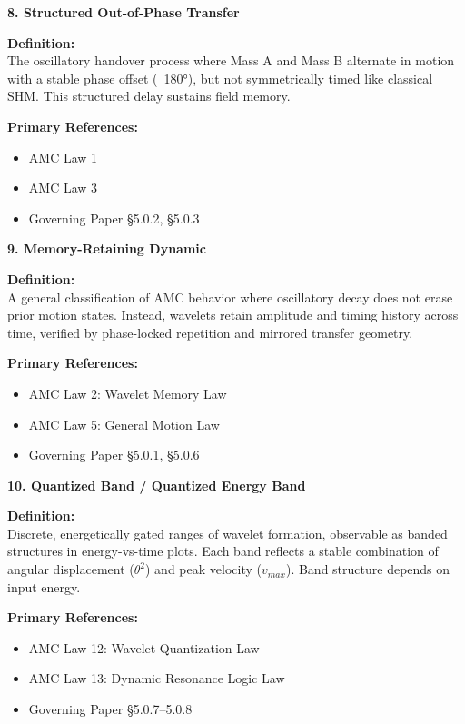 \documentclass[10pt,aps,pre,onecolumn,superscriptaddress,notitlepage]{revtex4-2}
\begin{document}
\vspace{1em}

\noindent\textbf{8. Structured Out-of-Phase Transfer}

\textbf{Definition:} \\
The oscillatory handover process where Mass A and Mass B alternate in motion with a stable phase offset (~180°), but not symmetrically timed like classical SHM. This structured delay sustains field memory.

\textbf{Primary References:}
\begin{itemize}[leftmargin=1.5em]
  \item AMC Law 1
  \item AMC Law 3
  \item Governing Paper §5.0.2, §5.0.3
\end{itemize}

\vspace{1em}

\noindent\textbf{9. Memory-Retaining Dynamic}

\textbf{Definition:} \\
A general classification of AMC behavior where oscillatory decay does not erase prior motion states. Instead, wavelets retain amplitude and timing history across time, verified by phase-locked repetition and mirrored transfer geometry.

\textbf{Primary References:}
\begin{itemize}[leftmargin=1.5em]
  \item AMC Law 2: Wavelet Memory Law
  \item AMC Law 5: General Motion Law
  \item Governing Paper §5.0.1, §5.0.6
\end{itemize}

\vspace{1em}

\noindent\textbf{10. Quantized Band / Quantized Energy Band}

\textbf{Definition:} \\
Discrete, energetically gated ranges of wavelet formation, observable as banded structures in energy-vs-time plots. Each band reflects a stable combination of angular displacement ($\theta^2$) and peak velocity ($v_{max}$). Band structure depends on input energy.

\textbf{Primary References:}
\begin{itemize}[leftmargin=1.5em]
  \item AMC Law 12: Wavelet Quantization Law
  \item AMC Law 13: Dynamic Resonance Logic Law
  \item Governing Paper §5.0.7–5.0.8
\end{itemize}
\end{document}
